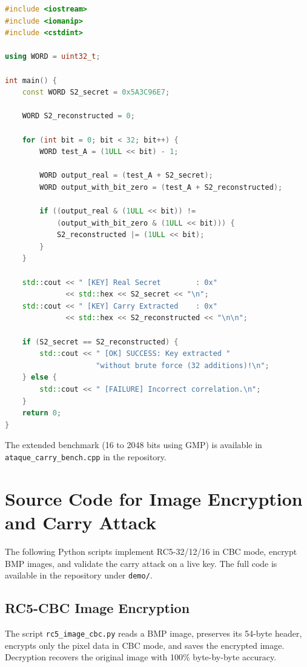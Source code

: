 \documentclass{sbc2023-pdf}%
\theoremstyle{plain}
\begin{document}
\begin{lstlisting}[language=C++,caption=Carry attack on RC5 -- subkey recovery in 32 sums]
#include <iostream>
#include <iomanip>
#include <cstdint>

using WORD = uint32_t;

int main() {
    const WORD S2_secret = 0x5A3C96E7;

    WORD S2_reconstructed = 0;

    for (int bit = 0; bit < 32; bit++) {
        WORD test_A = (1ULL << bit) - 1;

        WORD output_real = (test_A + S2_secret);
        WORD output_with_bit_zero = (test_A + S2_reconstructed);

        if ((output_real & (1ULL << bit)) !=
            (output_with_bit_zero & (1ULL << bit))) {
            S2_reconstructed |= (1ULL << bit);
        }
    }

    std::cout << " [KEY] Real Secret        : 0x"
              << std::hex << S2_secret << "\n";
    std::cout << " [KEY] Carry Extracted    : 0x"
              << std::hex << S2_reconstructed << "\n\n";

    if (S2_secret == S2_reconstructed) {
        std::cout << " [OK] SUCCESS: Key extracted "
                     "without brute force (32 additions)!\n";
    } else {
        std::cout << " [FAILURE] Incorrect correlation.\n";
    }
    return 0;
}
\end{lstlisting}

The extended benchmark (16 to 2048 bits using GMP) is available in \texttt{ataque\_carry\_bench.cpp} in the repository.

\section{Source Code for Image Encryption and Carry Attack}
\label{app:image_code}

The following Python scripts implement RC5-32/12/16 in CBC mode, encrypt BMP images, and validate the carry attack on a live key. The full code is available in the repository under \texttt{demo/}.

\subsection{RC5-CBC Image Encryption}
\label{app:rc5_image_code}

The script \texttt{rc5\_image\_cbc.py} reads a BMP image, preserves its 54-byte header, encrypts only the pixel data in CBC mode, and saves the encrypted image. Decryption recovers the original image with 100\% byte-by-byte accuracy.
\end{document}
